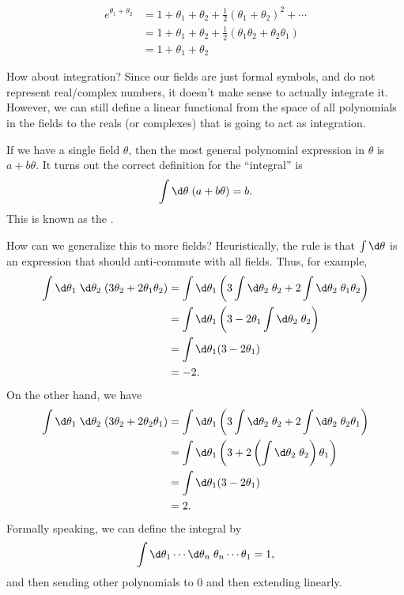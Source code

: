\documentclass[a4paper]{article}
\begin{document}
\begin{eg}
  \begin{align*}
    e^{\theta_1 + \theta_2} &= 1 + \theta_1 + \theta_2 + \frac{1}{2}(\theta_1 + \theta_2)^2 + \cdots\\
    &= 1 + \theta_1 + \theta_2 + \frac{1}{2}(\theta_1 \theta_2 + \theta_2 \theta_1)\\
    &= 1 + \theta_1 + \theta_2
  \end{align*}
\end{eg}

How about integration? Since our fields are just formal symbols, and do not represent real/complex numbers, it doesn't make sense to actually integrate it. However, we can still define a linear functional from the space of all polynomials in the fields to the reals (or complexes) that is going to act as integration.

If we have a single field $\theta$, then the most general polynomial expression in $\theta$ is $a + b \theta$. It turns out the correct definition for the ``integral'' is
\[
  \int \d \theta\; (a + b \theta) = b.
\]
This is known as the .

How can we generalize this to more fields? Heuristically, the rule is that $\int \d \theta$ is an expression that should anti-commute with all fields. Thus, for example,
\begin{align*}
  \int \d \theta_1 \; \d \theta_2\; (3\theta_2 + 2 \theta_1 \theta_2) &= \int \d \theta_1 \left(3 \int \d \theta_2\; \theta_2 + 2 \int \d \theta_2 \; \theta_1 \theta_2\right)\\
  &= \int \d \theta_1 \left(3 - 2 \theta_1 \int \d \theta_2 \; \theta_2\right)\\
  &= \int \d \theta_1 (3 - 2 \theta_1)\\
  &= -2.
\end{align*}
On the other hand, we have
\begin{align*}
  \int \d \theta_1 \; \d \theta_2\; (3\theta_2 + 2 \theta_2 \theta_1) &= \int \d \theta_1 \left(3 \int \d \theta_2\; \theta_2 + 2 \int \d \theta_2 \; \theta_2 \theta_1\right)\\
  &= \int \d \theta_1 \left(3 + 2 \left(\int \d \theta_2 \; \theta_2\right) \theta_1\right)\\
  &= \int \d \theta_1 (3 - 2 \theta_1)\\
  &= 2.
\end{align*}
Formally speaking, we can define the integral by
\[
  \int \d \theta_1 \cdots \d \theta_n\; \theta_n \cdots \theta_1 = 1,
\]
and then sending other polynomials to $0$ and then extending linearly.
\end{document}

